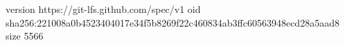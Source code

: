 version https://git-lfs.github.com/spec/v1
oid sha256:221008a0b4523404017e34f5b8269f22c460834ab3ffc60563948ecd28a5aad8
size 5566
